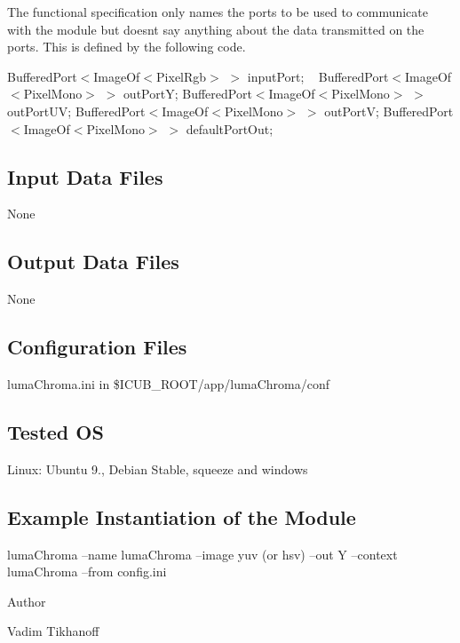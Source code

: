 The functional specification only names the ports to be used to communicate with the module but doesn\textquotesingle{}t say anything about the data transmitted on the ports. This is defined by the following code.

{\ttfamily Buffered\+Port$<$Image\+Of$<$\+Pixel\+Rgb$>$} $>$ {\ttfamily input\+Port}; ~\newline
 {\ttfamily Buffered\+Port$<$Image\+Of$<$\+Pixel\+Mono$>$} $>$ {\ttfamily out\+PortY}; {\ttfamily Buffered\+Port$<$Image\+Of$<$\+Pixel\+Mono$>$} $>$ {\ttfamily out\+Port\+UV}; {\ttfamily Buffered\+Port$<$Image\+Of$<$\+Pixel\+Mono$>$} $>$ {\ttfamily out\+PortV}; {\ttfamily Buffered\+Port$<$Image\+Of$<$\+Pixel\+Mono$>$} $>$ {\ttfamily default\+Port\+Out};\hypertarget{group__lumaChroma_in_files_sec}{}\subsection{Input Data Files}\label{group__lumaChroma_in_files_sec}
None\hypertarget{group__lumaChroma_out_data_sec}{}\subsection{Output Data Files}\label{group__lumaChroma_out_data_sec}
None\hypertarget{group__lumaChroma_conf_file_sec}{}\subsection{Configuration Files}\label{group__lumaChroma_conf_file_sec}
{\ttfamily luma\+Chroma.\+ini} in {\ttfamily \$\+I\+C\+U\+B\+\_\+\+R\+O\+OT/app/luma\+Chroma/conf} ~\newline
 \hypertarget{group__blobExtractor_tested_os_sec}{}\subsection{Tested OS}\label{group__blobExtractor_tested_os_sec}
Linux\+: Ubuntu 9., Debian Stable, squeeze and windows\hypertarget{group__lumaChroma_example_sec}{}\subsection{Example Instantiation of the Module}\label{group__lumaChroma_example_sec}
{\ttfamily luma\+Chroma --name luma\+Chroma --image yuv (or hsv) --out Y --context luma\+Chroma --from config.\+ini }

\begin{DoxyAuthor}{Author}

\end{DoxyAuthor}
Vadim Tikhanoff

